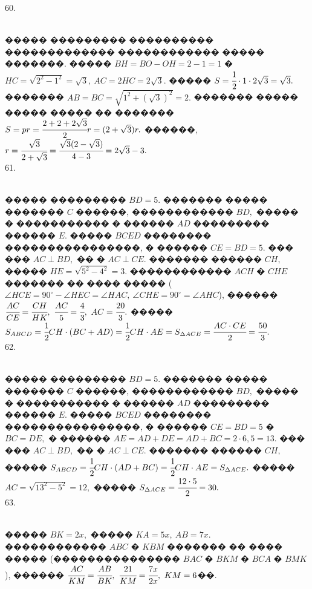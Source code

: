 \documentclass[12pt]{article}
\begin{document}
60. \begin{figure}[ht!]
\end{figure}\\
����� ��������� ���������� ������������� ������������ ����� �������. ����� $BH=BO-OH=2-1=1$ � $HC=\sqrt{2^2-1^2}=\sqrt{3},\ AC=2HC=2\sqrt{3}.$ ����� $S=\cfrac{1}{2}\cdot1\cdot2\sqrt{3}=\sqrt{3}.$ ������� $AB=BC=\sqrt{1^2+(\sqrt{3})^2}=2.$ ������� ����� ����� ����� �� ������� $S=pr=\cfrac{2+2+2\sqrt{3}}{2}r=(2+\sqrt{3})r.$ ������, $r=\cfrac{\sqrt{3}}{2+\sqrt{3}}=\cfrac{\sqrt{3}(2-\sqrt{3})}{4-3}=2\sqrt{3}-3.$\\
61. \begin{figure}[ht!]
\end{figure}\\
����� ��������� $BD=5.$ ������� ����� ������� $C$ ������, ������������ $BD,$ ����� � ����������� � ������ $AD$ ��������� ������ $E.$ ����� $BCED$ �������� ����������������, � ������ $CE=BD=5.$ ��� ��� $AC\perp BD,$ �� � $AC\perp CE.$ ������� ������ $CH,$ ����� $HE=\sqrt{5^2-4^2}=3.$ ������������ $ACH$ � $CHE$ ������� �� ���� ����� ($\angle HCE=90^\circ-\angle HEC=\angle HAC,\ \angle CHE=90^\circ=\angle AHC$), ������ $\cfrac{AC}{CE}=\cfrac{CH}{HK},\ \cfrac{AC}{5}=\cfrac{4}{3},\ AC=\cfrac{20}{3}.$ ����� $S_{ABCD}=\cfrac{1}{2}CH\cdot(BC+AD)=\cfrac{1}{2}CH\cdot AE=S_{\Delta ACE}=\cfrac{AC\cdot CE}{2}=\cfrac{50}{3}.$\\
62. \begin{figure}[ht!]
\end{figure}\\
����� ��������� $BD=5.$ ������� ����� ������� $C$ ������, ������������ $BD,$ ����� � ����������� � ������ $AD$ ��������� ������ $E.$ ����� $BCED$ �������� ����������������, � ������ $CE=BD=5$ � $BC=DE,$ � ������ $AE=AD+DE=AD+BC=2\cdot6,5=13.$ ��� ��� $AC\perp BD,$ �� � $AC\perp CE.$
������� ������ $CH,$ ����� $S_{ABCD}=\cfrac{1}{2} CH\cdot (AD+BC)=\cfrac{1}{2} CH\cdot AE=S_{\Delta ACE}.$ ����� $AC=\sqrt{13^2-5^2}=12,$ ����� $S_{\Delta ACE}=\cfrac{12\cdot5}{2}=30.$\\
63. \begin{figure}[ht!]
\end{figure}\\
����� $BK=2x,$ ����� $KA=5x,\ AB=7x.$ ������������ $ABC$ � $KBM$ ������� �� ���� ����� (��������������� $BAC$ � $BKM$ � $BCA$ � $BMK$), ������ $\cfrac{AC}{KM}=\cfrac{AB}{BK},\ \cfrac{21}{KM}=\cfrac{7x}{2x},\ KM=6$��.\\
\end{document}
